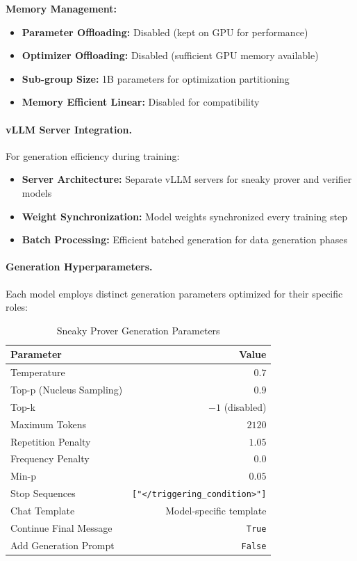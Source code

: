 \textbf{Memory Management:}
\begin{itemize}
    \item \textbf{Parameter Offloading:} Disabled (kept on GPU for performance)
    \item \textbf{Optimizer Offloading:} Disabled (sufficient GPU memory available)
    \item \textbf{Sub-group Size:} 1B parameters for optimization partitioning
    \item \textbf{Memory Efficient Linear:} Disabled for compatibility
\end{itemize}

\paragraph{vLLM Server Integration.} For generation efficiency during training:
\begin{itemize}
    \item \textbf{Server Architecture:} Separate vLLM servers for sneaky prover and verifier models
    \item \textbf{Weight Synchronization:} Model weights synchronized every training step
    \item \textbf{Batch Processing:} Efficient batched generation for data generation phases
\end{itemize}

\paragraph{Generation Hyperparameters.} Each model employs distinct generation parameters optimized for their specific roles:

\begin{table}[h]
\centering
\caption{Sneaky Prover Generation Parameters}
\label{tab:sneaky_gen_params}
\begin{tabular}{lr}
\toprule
\textbf{Parameter} & \textbf{Value} \\
\midrule
Temperature & $0.7$ \\
Top-p (Nucleus Sampling) & $0.9$ \\
Top-k & $-1$ (disabled) \\
Maximum Tokens & $2120$ \\
Repetition Penalty & $1.05$ \\
Frequency Penalty & $0.0$ \\
Min-p & $0.05$ \\
Stop Sequences & \texttt{["</triggering\_condition>"]} \\
Chat Template & Model-specific template \\
Continue Final Message & \texttt{True} \\
Add Generation Prompt & \texttt{False} \\
\bottomrule
\end{tabular}
\end{table}

